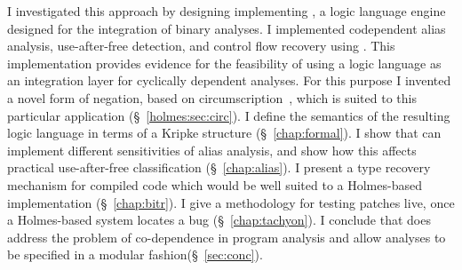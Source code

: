 I investigated this approach by designing implementing \sysname, a logic language engine designed for the integration of binary analyses.
I implemented codependent alias analysis, use-after-free detection, and control flow recovery using \sysname.
This implementation provides evidence for the feasibility of using a logic language as an integration layer for cyclically dependent analyses.
For this purpose I invented a novel form of negation, based on circumscription~\cite{circumscription}, which is suited to this particular application (\S~\ref{holmes:sec:circ}).
I define the semantics of the resulting logic language in terms of a Kripke structure (\S~\ref{chap:formal}).
I show that \sysname can implement different sensitivities of alias analysis, and show how this affects practical use-after-free classification (\S~\ref{chap:alias}).
I present a type recovery mechanism for compiled code which would be well suited to a Holmes-based implementation (\S~\ref{chap:bitr}).
I give a methodology for testing patches live, once a Holmes-based system locates a bug (\S~\ref{chap:tachyon}).
I conclude that \sysname does address the problem of co-dependence in program analysis and allow analyses to be specified in a modular fashion(\S~\ref{sec:conc}).
